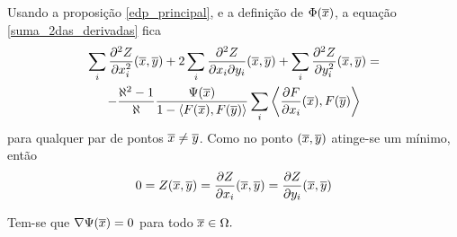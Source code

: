 Usando a proposição \ref{edp_principal}, e a definição de $\Phi(\overline{x})$, a equação \eqref{suma_2das_derivadas} fica
\begin{multline}\label{suma_2da_der_aleph}
\sum_i \frac{\partial^2 Z}{\partial x_i^2}(\overline{x},\overline{y}) + 2 \sum_i \frac{\partial^2 Z}{\partial x_i \partial y_i}(\overline{x},\overline{y}) + \sum_i \frac{\partial^2 Z}{\partial y_i^2}(\overline{x},\overline{y}) =\\
- \frac{\aleph^2 - 1}{\aleph} \frac{\Psi(\overline{x})}{1 - \langle F(\overline{x}), F(\overline{y}) \rangle} \sum_i \left\langle \frac{\partial F}{\partial x_i}(\overline{x}), F(\overline{y}) \right\rangle
\end{multline}
para qualquer par de pontos $\overline{x} \neq \overline{y}$. Como no ponto $(\overline{x},\overline{y})$ atinge-se um mínimo, então
\begin{equation*}
	0 = Z(\overline{x},\overline{y}) = \frac{\partial Z}{\partial x_i}(\overline{x},\overline{y}) = \frac{\partial Z}{\partial y_i}(\overline{x},\overline{y})
\end{equation*}

\begin{proposicao}\label{gradiente_nulo}
	Tem-se que $\nabla \Psi(\overline{x}) = 0$ para todo $\overline{x} \in \Omega.$
\end{proposicao}

